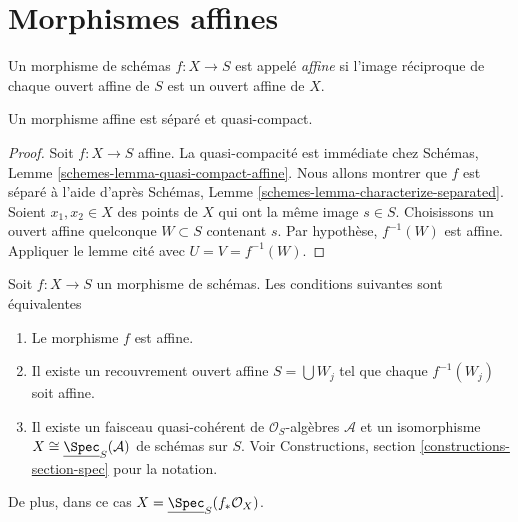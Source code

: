 \section{Morphismes affines}
\label{section-affine}

\begin{definition}
\label{definition-affine}
Un morphisme de schémas $f : X \to S$ est appelé {\it affine}
si l'image réciproque de chaque ouvert affine de $S$ est un ouvert affine
de $X$.
\end{definition}

\begin{lemma}
\label{lemma-affine-separated}
Un morphisme affine est séparé et quasi-compact.
\end{lemma}

\begin{proof}
Soit $f : X \to S$ affine. La quasi-compacité est immédiate chez Schémas,
Lemme \ref{schemes-lemma-quasi-compact-affine}. Nous allons montrer que $f$
est séparé à l'aide d'après
Schémas, Lemme \ref{schemes-lemma-characterize-separated}. Soient $x_1, x_2 \in X$ des points de $X$
qui ont la même image $s \in S$. Choisissons un
ouvert affine quelconque $W \subset S$ contenant $s$. Par hypothèse,
$f^{-1}(W)$ est affine. Appliquer le lemme cité avec $U = V = f^{-1}(W)$.
\end{proof}

\begin{lemma}
\label{lemma-characterize-affine}
\begin{reference}
\cite[II, Corollaire 1.3.2]{EGA}
\end{reference}
Soit $f : X \to S$ un morphisme de schémas. Les conditions
suivantes sont équivalentes
\begin{enumerate}
\item Le morphisme $f$ est affine.
\item Il existe un recouvrement ouvert affine $S = \bigcup W_j$ tel
que chaque $f^{-1}(W_j)$ soit affine.
\item Il existe un faisceau quasi-cohérent de $\mathcal{O}_S$-algèbres
$\mathcal{A}$ et un
isomorphisme $X \cong \underline{\Spec}_S(\mathcal{A})$ de schémas
sur $S$. Voir
Constructions, section \ref{constructions-section-spec} pour la notation.
\end{enumerate}
De plus, dans ce cas $X = \underline{\Spec}_S(f_*\mathcal{O}_X)$.
\end{lemma}

